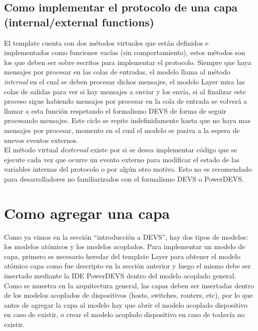 \documentclass[10pt,a4paper]{article}
\begin{document}
\subsection{Como implementar el protocolo de una capa (internal/external functions)}

El template cuenta con dos métodos virtuales que están definidos e implementados como funciones vacías (sin comportamiento), estos métodos son los que deben ser sobre escritos para implementar el protocolo. Siempre que haya mensajes por procesar en las colas de entradas, el modelo llama al método \textit{internal} en el cual se deben procesar dichos mensajes, el modelo Layer mira las colas de salidas para ver si hay mensajes a enviar y los envía, si al finalizar este proceso sigue habiendo mensajes por procesar en la cola de entrada se volverá a llamar a esta función respetando el formalismo DEVS de forma de seguir procesando mensajes. Este ciclo se repite indefinidamente hasta que no haya mas mensajes por procesar, momento en el cual el modelo se pasiva a la espera de nuevos eventos externos. \\

El método virtual \textit{dexternal} existe por si se desea implementar código que se ejecute cada vez que ocurre un evento externo para modificar el estado de las variables internas del protocolo o por algún otro motivo. Esto no es recomendado para desarrolladores no familiarizados con el formalismo DEVS o PowerDEVS. \\

\section{Como agregar una capa}

Como ya vimos en la sección ``introducción a DEVS'', hay dos tipos de modelos: los modelos atómicos y los modelos acoplados. Para implementar un modelo de capa, primero es necesario heredar del template Layer para obtener el modelo atómico capa como fue descripto en la sección anterior y luego el mismo debe ser insertado mediante la IDE PowerDEVS dentro del modelo acoplado general. \\

Como se muestra en la arquitectura general, las capas deben ser insertadas dentro de los modelos acoplados de dispositivos (hosts, switches, routers, etc), por lo que antes de agregar la capa al modelo hay que abrir el modelo acoplado dispositivo en caso de existir, o crear el modelo acoplado dispositivo en caso de todavía no existir.
\end{document}
